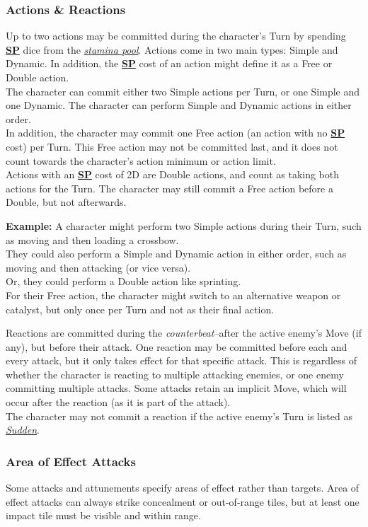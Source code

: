 \documentclass[12pt]{article}
\newcommand{\refto}[1]{\hyperlink{#1}{\textbf{#1}}}
\newcommand{\reftoit}[1]{\hyperlink{#1}{\emph{#1}}}
\begin{document}
\begin{multicols*}{2}
\subsubsection{Actions \& Reactions}
Up to two actions may be committed during the character’s Turn by spending \refto{SP} dice from the \reftoit{stamina pool}. Actions come in two main types: Simple and Dynamic. In addition, the \refto{SP} cost of an action might define it as a Free or Double action.\\
The character can commit either two Simple actions per Turn, or one Simple and one Dynamic. The character can perform Simple and Dynamic actions in either order.\\
In addition, the character may commit one Free action (an action with no \refto{SP} cost) per Turn. This Free action may not be committed last, and it does not count towards the character’s action minimum or action limit.\\
Actions with an \refto{SP} cost of 2D are Double actions, and count as taking both actions for the Turn. The character may still commit a Free action before a Double, but not afterwards.
\begin{tcolorbox}
\textbf{Example:} A character might perform two Simple actions during their Turn, such as moving and then loading a crossbow.\\
They could also perform a Simple and Dynamic action in either order, such as moving and then attacking (or vice versa).\\
Or, they could perform a Double action like sprinting.\\
For their Free action, the character might switch to an alternative weapon or catalyst, but only once per Turn and not as their final action.
\end{tcolorbox}
Reactions are committed during the \emph{counterbeat}--after the active enemy’s Move (if any), but before their attack. One reaction may be committed before each and every attack, but it only takes effect for that specific attack. This is regardless of whether the character is reacting to multiple attacking enemies, or one enemy committing multiple attacks. Some attacks retain an implicit Move, which will occur after the reaction (as it is part of the attack).\\
The character may not commit a reaction if the active enemy’s Turn is listed as \reftoit{Sudden}.

\vspace*{\fill}
\columnbreak

\subsubsection{Area of Effect Attacks}
Some attacks and attunements specify areas of effect rather than targets. Area of effect attacks can always strike concealment or out-of-range tiles, but at least one impact tile must be visible and within range.\\


\end{multicols*}
\end{document}
